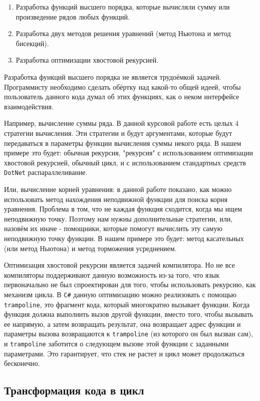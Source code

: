 \begin{enumerate}
	\item Разработка функций высшего порядка, которые вычисляли сумму или произведение рядов любых функций.
	\item Разработка двух методов решения уравнений (метод Ньютона и метод бисекций).
	\item Разработка оптимизации хвостовой рекурсией.
\end{enumerate}

Разработка функций высшего порядка не является трудоёмкой задачей. 
Программисту необходимо сделать обёртку над какой-то общей идеей, чтобы пользователь данного кода думал об этих функциях, как о неком интерфейсе взаимодействия.

Например, вычисление суммы ряда. В данной курсовой работе есть целых 4 стратегии вычисления. Эти стратегии и будут аргументами, которые будут передаваться в параметры функции вычисления суммы некого ряда.
В нашем примере это будет: обычная рекурсия, "рекурсия" с использованием оптимизации хвостовой рекурсией, обычный цикл, и с использованием стандартных средств \texttt{DotNet} распараллеливание.

Или, вычисление корней уравнения: в данной работе показано, как можно использовать метод нахождения неподвижной функции для поиска корня уравнения.
Проблема в том, что не каждая функция сходится, когда мы ищем неподвижную точку.
Поэтому нам нужны дополнительные стратегии, или, назовём их иначе - помощники, которые помогут вычислить эту самую неподвижную точку функции.
В нашем примере это будет: метод касательных (или метод Ньютона) и метод торможения усреднением.

Оптимизация хвостовой рекурсии является задачей компилятора.
Но не все компиляторы поддерживают данную возможность из-за того, что язык первоначально не был спроектирован для того, чтобы использовать рекурсию, как механизм цикла.
В \texttt{C\#} данную оптимизацию можно реализовать с помощью \texttt{trampoline}, это фрагмент кода, который многократно вызывает функции. 
Когда функция должна выполнить вызов другой функции, вместо того, чтобы вызывать ее напрямую, а затем возвращать результат, она возвращает адрес функции и параметры вызова возвращаются к \texttt{trampoline} (из которого он был вызван сам), и \texttt{trampoline} заботится о следующем вызове этой функции с заданными параметрами. Это гарантирует, что стек не растет и цикл может продолжаться бесконечно.

\subsection{Трансформация кода в цикл}
\label{transformation}

